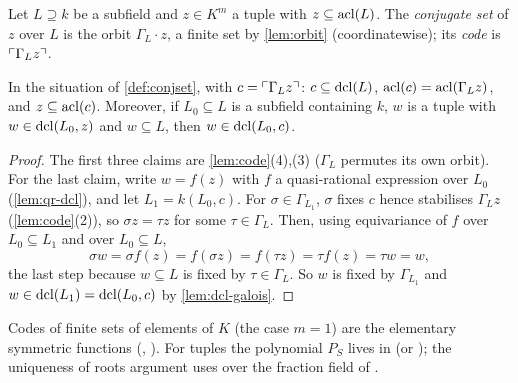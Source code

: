 \begin{definition}\label{def:conjset}
Let $L\supseteq k$ be a subfield and $z\in K^m$ a tuple with $z\subseteq\operatorname{acl}(L)$.  The
\emph{conjugate set} of $z$ over $L$ is the orbit $\Gamma_L\cdot z$, a finite set by
\cref{lem:orbit} (coordinatewise); its \emph{code} is $\ulcorner \Gamma_L z\urcorner$.
\end{definition}

\begin{lemma}\label{lem:conjcode}
In the situation of \cref{def:conjset}, with $c=\ulcorner \Gamma_L z\urcorner$:
$c\subseteq\operatorname{dcl}(L)$, $\operatorname{acl}(c)=\operatorname{acl}(\Gamma_L z)$, and $z\subseteq\operatorname{acl}(c)$.
Moreover, if $L_0\subseteq L$ is a subfield containing $k$, $w$ is a tuple with
$w\in\operatorname{dcl}(L_0,z)$ and $w\subseteq L$, then $w\in\operatorname{dcl}(L_0,c)$.
\end{lemma}
\begin{proof}
The first three claims are \cref{lem:code}(4),(3) ($\Gamma_L$ permutes its own orbit).
For the last claim, write $w=f(z)$ with $f$ a quasi-rational expression over $L_0$
(\cref{lem:qr-dcl}), and let $L_1=k(L_0,c)$.  For $\sigma\in\Gamma_{L_1}$,
$\sigma$ fixes $c$ hence stabilises $\Gamma_Lz$ (\cref{lem:code}(2)), so
$\sigma z=\tau z$ for some $\tau\in\Gamma_L$.  Then, using equivariance of $f$ over
$L_0\subseteq L_1$ and over $L_0\subseteq L$,
\[
   \sigma w=\sigma f(z)=f(\sigma z)=f(\tau z)=\tau f(z)=\tau w=w,
\]
the last step because $w\subseteq L$ is fixed by $\tau\in\Gamma_L$.  So $w$ is fixed by
$\Gamma_{L_1}$ and $w\in\operatorname{dcl}(L_1)=\operatorname{dcl}(L_0,c)$ by \cref{lem:dcl-galois}.
\end{proof}

\begin{leannote}
Codes of finite sets of elements of $K$ (the case $m=1$) are the elementary symmetric
functions (, ).  For tuples
the polynomial $P_S$ lives in  (or
); the uniqueness of roots argument uses
 over the fraction field of .
\end{leannote}

